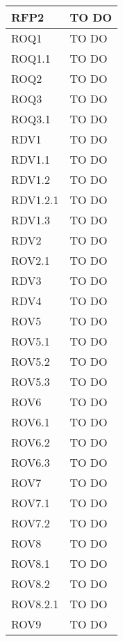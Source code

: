 \begin{center}
\begin{longtable}{| p{4cm} | p{8cm} |}
\hline
RFP2   &  TO DO \\
\hline
ROQ1   &  TO DO \\
\hline
ROQ1.1   &  TO DO \\
\hline
ROQ2   &  TO DO \\
\hline
ROQ3   &  TO DO \\
\hline
ROQ3.1   &  TO DO \\
\hline
RDV1   &  TO DO \\
\hline
RDV1.1   &  TO DO \\
\hline
RDV1.2   &  TO DO \\
\hline
RDV1.2.1   &  TO DO \\
\hline
RDV1.3   &  TO DO \\
\hline
RDV2   &  TO DO \\
\hline
ROV2.1   &  TO DO \\
\hline
RDV3   &  TO DO \\
\hline
RDV4   &  TO DO \\
\hline
ROV5   &  TO DO \\
\hline
ROV5.1   &  TO DO \\
\hline
ROV5.2   &  TO DO \\
\hline
ROV5.3   &  TO DO \\
\hline
ROV6   &  TO DO \\
\hline
ROV6.1   &  TO DO \\
\hline
ROV6.2   &  TO DO \\
\hline
ROV6.3   &  TO DO \\
\hline
ROV7   &  TO DO \\
\hline
ROV7.1   &  TO DO \\
\hline
ROV7.2   &  TO DO \\
\hline
ROV8   &  TO DO \\
\hline
ROV8.1   &  TO DO \\
\hline
ROV8.2   &  TO DO \\
\hline
ROV8.2.1   &  TO DO \\
\hline
ROV9   &  TO DO \\
\hline
\end{longtable}
\egroup
\end{center}
